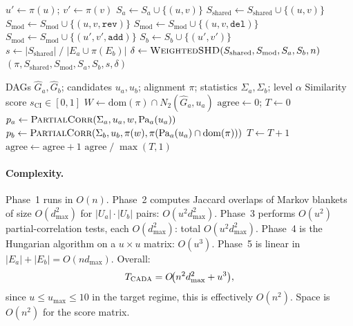 \documentclass[11pt,a4paper]{article}
\theoremstyle{definition}
\begin{document}
\begin{algorithm}[t]
\begin{algorithmic}[1]
  \State $u'\gets\pi(u)$;\; $v'\gets\pi(v)$
    $S_a\gets S_a\cup\{(u,v)\}$
    $S_{\mathrm{shared}}\gets S_{\mathrm{shared}}\cup\{(u,v)\}$
    $S_{\mathrm{mod}}\gets S_{\mathrm{mod}}\cup\{(u,v,\texttt{rev})\}$
  \Else\;
    $S_{\mathrm{mod}}\gets S_{\mathrm{mod}}\cup\{(u,v,\texttt{del})\}$
  \EndIf
\EndFor
{}
    \State $S_{\mathrm{mod}}\gets S_{\mathrm{mod}}
           \cup\{(u',v',\texttt{add})\}$
  \EndIf
\EndFor
{}
  \State $S_b\gets S_b\cup\{(u',v')\}$
\EndFor
\Statex
\State $s\gets|S_{\mathrm{shared}}|\;/\;
       |E_a\cup\pi(E_b)|$
\State $\delta\gets\textsc{WeightedSHD}(S_{\mathrm{shared}},
       S_{\mathrm{mod}},S_a,S_b,n)$
\State \Return $(\pi,S_{\mathrm{shared}},S_{\mathrm{mod}},S_a,S_b,s,\delta)$
\end{algorithmic}
\end{algorithm}

\begin{algorithm}[t]
\caption{\textsc{CIFingerprint}: Conditional-Independence Pattern Similarity}
\label{alg:ci-finger}
\begin{algorithmic}[1]
\Require DAGs $\hat{G}_a,\hat{G}_b$; candidates $u_a,u_b$;
  alignment $\pi$; statistics $\Sigma_a,\Sigma_b$; level $\alpha$
\Ensure Similarity score $s_{\mathrm{CI}}\in[0,1]$
\State $W\gets\mathrm{dom}(\pi)\cap N_2(\hat{G}_a,u_a)$
\State $\mathrm{agree}\gets 0$;\; $T\gets 0$
  \State $p_a\gets\textsc{PartialCorr}(\Sigma_a,u_a,w,
         \mathrm{Pa}_a(u_a))$
  \State $p_b\gets\textsc{PartialCorr}(\Sigma_b,u_b,\pi(w),
         \pi(\mathrm{Pa}_a(u_a)\cap\mathrm{dom}(\pi)))$
  \State $T\gets T+1$
    $\mathrm{agree}\gets\mathrm{agree}+1$
  \EndIf
\EndFor
\State \Return $\mathrm{agree}\;/\;\max(T,1)$
\end{algorithmic}
\end{algorithm}

\paragraph{Complexity.}
Phase~1 runs in $O(n)$.
Phase~2 computes Jaccard overlaps of Markov blankets of size
$O(d_{\max}^2)$ for $|U_a|\cdot|U_b|$ pairs: $O(u^2 d_{\max}^2)$.
Phase~3 performs $O(u^2)$ partial-correlation tests, each $O(d_{\max}^2)$:
total $O(u^2 d_{\max}^2)$.
Phase~4 is the Hungarian algorithm on a $u\times u$ matrix: $O(u^3)$.
Phase~5 is linear in $|E_a|+|E_b|=O(n d_{\max})$.
Overall:
\[
  T_{\textsc{CADA}}=O\!\bigl(n^2 d_{\max}^2+u^3\bigr),
\]
since $u\le u_{\max}\le 10$ in the target regime, this is effectively
$O(n^2)$.  Space is $O(n^2)$ for the score matrix.
\end{document}
